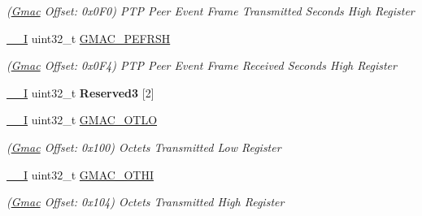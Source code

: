 \begin{DoxyCompactItemize}
\begin{DoxyCompactList}\small\item\em (\mbox{\hyperlink{structGmac}{Gmac}} Offset\+: 0x0\+F0) P\+TP Peer Event Frame Transmitted Seconds High Register \end{DoxyCompactList}\item 
\mbox{\label{structGmac_a51c57fd6fe2b028b664d5c2873faaf67}} 
\mbox{\hyperlink{core__cm7_8h_af63697ed9952cc71e1225efe205f6cd3}{\+\_\+\+\_\+I}} uint32\+\_\+t \mbox{\hyperlink{structGmac_a51c57fd6fe2b028b664d5c2873faaf67}{G\+M\+A\+C\+\_\+\+P\+E\+F\+R\+SH}}
\begin{DoxyCompactList}\small\item\em (\mbox{\hyperlink{structGmac}{Gmac}} Offset\+: 0x0\+F4) P\+TP Peer Event Frame Received Seconds High Register \end{DoxyCompactList}\item 
\mbox{\label{structGmac_a6fab8259a3d6ba97e9ee7ab91dba6735}} 
\mbox{\hyperlink{core__cm7_8h_af63697ed9952cc71e1225efe205f6cd3}{\+\_\+\+\_\+I}} uint32\+\_\+t {\bfseries Reserved3} \mbox{[}2\mbox{]}
\item 
\mbox{\label{structGmac_a827247dd0f0e0b3f56f43d2fe1e05757}} 
\mbox{\hyperlink{core__cm7_8h_af63697ed9952cc71e1225efe205f6cd3}{\+\_\+\+\_\+I}} uint32\+\_\+t \mbox{\hyperlink{structGmac_a827247dd0f0e0b3f56f43d2fe1e05757}{G\+M\+A\+C\+\_\+\+O\+T\+LO}}
\begin{DoxyCompactList}\small\item\em (\mbox{\hyperlink{structGmac}{Gmac}} Offset\+: 0x100) Octets Transmitted Low Register \end{DoxyCompactList}\item 
\mbox{\label{structGmac_ac1b5bfb0afef67d93b9db3ed24c7083b}} 
\mbox{\hyperlink{core__cm7_8h_af63697ed9952cc71e1225efe205f6cd3}{\+\_\+\+\_\+I}} uint32\+\_\+t \mbox{\hyperlink{structGmac_ac1b5bfb0afef67d93b9db3ed24c7083b}{G\+M\+A\+C\+\_\+\+O\+T\+HI}}
\begin{DoxyCompactList}\small\item\em (\mbox{\hyperlink{structGmac}{Gmac}} Offset\+: 0x104) Octets Transmitted High Register \end{DoxyCompactList}\item 
\mbox{\label{structGmac_ab035488f3f19ba653b3d9430d4ec82a4}} 

\end{DoxyCompactItemize}
